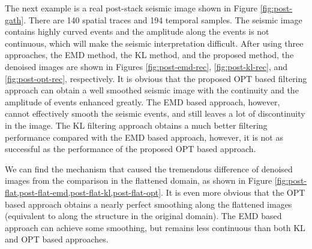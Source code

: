 The next example is a real post-stack seismic image shown in Figure \ref{fig:post-gath}. There are 140 spatial traces and 194 temporal samples. %
The seismic image contains highly curved events and the amplitude along the events is not continuous, which will make the seismic interpretation difficult. After using three approaches, the EMD method, the KL method, and the proposed method, the denoised images are shown in Figures \ref{fig:post-emd-rec}, \ref{fig:post-kl-rec}, and \ref{fig:post-opt-rec}, respectively. It is obvious that the proposed OPT based filtering approach can obtain a well smoothed seismic image with the continuity and the amplitude of events enhanced greatly. The EMD based approach, however, cannot effectively smooth the seismic events, and still leaves a lot of discontinuity in the image. The KL filtering approach obtains a much better filtering performance compared with the EMD based approach, however, it is not as successful as the performance of the proposed OPT based approach. 

We can find the mechanism that caused the tremendous difference of denoised images from the comparison in the flattened domain, as shown in Figure \ref{fig:post-flat,post-flat-emd,post-flat-kl,post-flat-opt}. It is even more obvious that the OPT based approach obtains a nearly perfect smoothing along the flattened images (equivalent to along the structure in the original domain). The EMD based approach can achieve some smoothing, but remains less continuous than both KL and OPT based approaches. 

